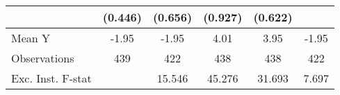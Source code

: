 {\begin{tabular}{l*{5}{c}}
            &     (0.446)         &     (0.656)         &     (0.927)         &     (0.622)         &                     \\
\midrule
Mean Y      &       -1.95         &       -1.95         &        4.01         &        3.95         &       -1.95         \\
Observations&         439         &         422         &         438         &         438         &         422         \\
Exc. Inst. F-stat&                     &      15.546         &      45.276         &      31.693         &       7.697         \\
\bottomrule
\end{tabular}
}
